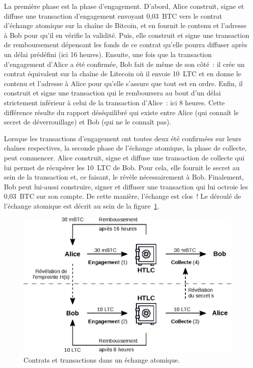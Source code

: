 La première phase est la phase d'engagement. D'abord, Alice construit, signe et diffuse une transaction d'engagement envoyant 0,03~BTC vers le contrat d'échange atomique sur la chaîne de Bitcoin, et en fournit le contenu et l'adresse à Bob pour qu'il en vérifie la validité. Puis, elle construit et signe une transaction de remboursement dépensant les fonds de ce contrat qu'elle pourra diffuser après un délai prédéfini (ici 16 heures). Ensuite, une fois que la transaction d'engagement d'Alice a été confirmée, Bob fait de même de son côté~: il crée un contrat équivalent sur la chaîne de Litecoin où il envoie 10~LTC et en donne le contenu et l'adresse à Alice pour qu'elle s'assure que tout est en ordre. Enfin, il construit et signe une transaction qui le remboursera au bout d'un délai strictement inférieur à celui de la transaction d'Alice~: ici 8 heures. Cette différence résulte du rapport déséquilibré qui existe entre Alice (qui connaît le secret de déverrouillage) et Bob (qui ne le connaît pas).

Lorsque les transactions d'engagement ont toutes deux été confirmées sur leurs chaînes respectives, la seconde phase de l'échange atomique, la phase de collecte, peut commencer. Alice construit, signe et diffuse une transaction de collecte qui lui permet de récupérer les 10~LTC de Bob. Pour cela, elle fournit le secret au sein de la transaction et, ce faisant, le révèle nécessairement à Bob. Finalement, Bob peut lui-aussi construire, signer et diffuser une transaction qui lui octroie les 0,03~BTC sur son compte. De cette manière, l'échange est clos~! Le déroulé de l'échange atomique est décrit au sein de la figure~\ref{fig:atomic-swap-contract}.

\begin{figure}[ht]
  \centering
  \includegraphics[scale=0.9]{img/atomic-swap-contract.eps}
  \caption{Contrats et transactions dans un échange atomique.}
  \label{fig:atomic-swap-contract}
\end{figure}

